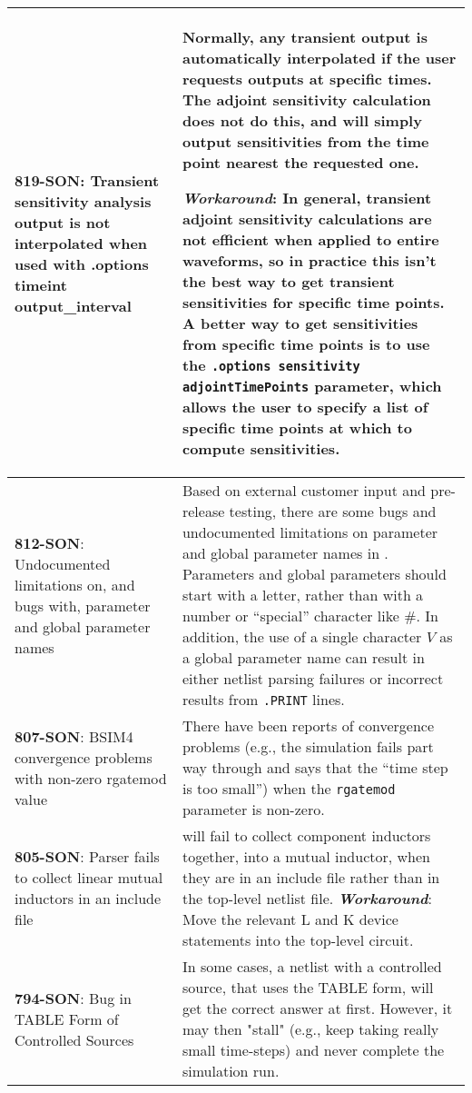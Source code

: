 {\begin{longtable}[h] {>{\raggedright\small}m{2in}|>{\raggedright\let\\\tabularnewline\small}m{3.5in}}
\textbf{819-SON}: Transient sensitivity analysis output is not interpolated when used with .options timeint output\_interval &

  Normally, any transient output is automatically interpolated if the user requests outputs at specific times.  The adjoint sensitivity calculation does not do this, and will simply output sensitivities from the time point nearest the requested one.
 
\textbf{\textit{Workaround}}: In general, transient adjoint sensitivity calculations are not efficient when applied to entire waveforms, so in practice this isn't the best way to get transient sensitivities for specific time points.  A better way to get sensitivities from specific time points is to use the \texttt{.options sensitivity adjointTimePoints} parameter, which allows the user to specify a list of specific time points at which to compute sensitivities.
  \\ \hline

\textbf{812-SON}: Undocumented limitations on, and bugs with, parameter and global 
parameter names & Based on external customer input and pre-release testing, there are
some bugs and undocumented limitations on parameter and global parameter names in 
\Xyce{}. Parameters and global parameters should start with a letter, rather than with a
number or ``special'' character like \#.  In addition, the use of a single 
character $V$ as a global parameter name can result in either netlist parsing failures
or incorrect results from \texttt{.PRINT} lines.  \\ \hline

\textbf{807-SON}: BSIM4 convergence problems with non-zero rgatemod value &
There have been reports of convergence problems (e.g., the \Xyce{} simulation
fails part way through and says that the ``time step is too small'')  when the 
\texttt{rgatemod} parameter is non-zero. \\ \hline

\textbf{805-SON}: Parser fails to collect linear mutual inductors in an include file & 
\Xyce{} will fail to collect component inductors together, into a mutual inductor, when
they are in an include file rather than in the top-level netlist file.  
\textbf{\textit{Workaround}}: Move the relevant L and K device statements into 
the top-level circuit. \\ \hline

\textbf{794-SON}: Bug in TABLE Form of \Xyce{} Controlled Sources & In some cases, a \Xyce{}
netlist with a controlled source, that uses the TABLE form, will get the correct answer 
at first.  However, it may then "stall" (e.g., keep taking really small time-steps)
and never complete the simulation run.  


\end{longtable}}
